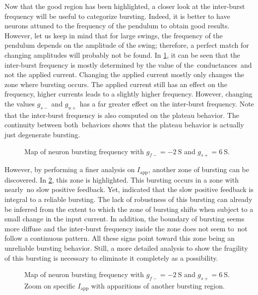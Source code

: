 Now that the good region has been highlighted, a closer look at the inter-burst frequency will be useful to categorize bursting.
Indeed, it is better to have neurons attuned to the frequency of the pendulum to obtain good results.
However, let us keep in mind that for large swings, the frequency of the pendulum depends on the amplitude of the swing; therefore, a perfect match for changing amplitudes will probably not be found.
In \cref{fig:neuron_burts}, it can be seen that the inter-burst frequency is mostly determined by the value of the conductances and not the applied current.
Changing the applied current mostly only changes the zone where bursting occurs.
The applied current still has an effect on the frequency, higher currents leads to a slightly higher frequency.
However, changing the values $g_{s-}$ and $g_{u+}$ has a far greater effect on the inter-burst frequency.
Note that the inter-burst frequency is also computed on the plateau behavior.
The continuity between both behaviors shows that the plateau behavior is actually just degenerate bursting.

\begin{figure}[!htb]
    \centering
    \caption{Map of neuron bursting frequency with $g_{f-} = \qty{-2}{\siemens}$ and $g_{s+} =  \qty{6}{\siemens}$.}
    \label{fig:neuron_burts}
\end{figure}

However, by performing a finer analysis on $I_\text{app}$, another zone of bursting can be discovered.
In \cref{fig:neuron_burts_fragile}, this zone is highlighted.
This bursting occurs in a zone with nearly no slow positive feedback.
Yet, \citet{burstingSlowFeedback} indicated that the slow positive feedback is integral to a reliable bursting.
The lack of robustness of this bursting can already be inferred from the extent to which the zone of bursting shifts when subject to a small change in the input current.
In addition, the boundary of bursting seems more diffuse and the inter-burst frequency inside the zone does not seem to not follow a continuous pattern.
All these signs point toward this zone being an unreliable bursting behavior.
Still, a more detailed analysis to show the fragility of this bursting is necessary to eliminate it completely as a possibility.

\begin{figure}[!htb]
    \centering
    \caption{Map of neuron bursting frequency with $g_{f-} = \qty{-2}{\siemens}$ and $g_{s+} =  \qty{6}{\siemens}$. Zoom on specific $I_\text{app}$ with apparitions of another bursting region.}
    \label{fig:neuron_burts_fragile}
\end{figure}

